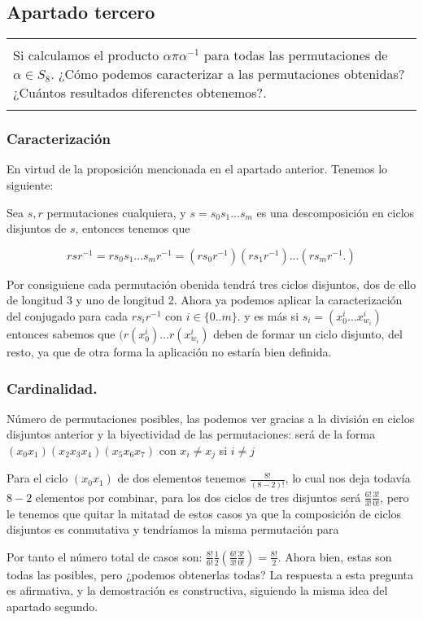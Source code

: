 \documentclass[12pt]{article}
\newenvironment{micaja}
{
    \begin{center}
    \begin{tabular}{|p{0.9\textwidth}|}
    \hline\\
    }   
    {   
    \\\\\hline
    \end{tabular} 
    \end{center}
    }
\begin{document}
\subsection{Apartado tercero}
\begin{micaja}
Si calculamos el producto $\alpha \pi \alpha^{-1}$ para todas las permutaciones de $\alpha \in S_8.$ ¿Cómo podemos caracterizar a las permutaciones obtenidas? ¿Cuántos resultados diferenctes obtenemos?.
\end{micaja}

\subsubsection*{Caracterización}
En virtud de la proposición mencionada en el apartado anterior.
Tenemos lo siguiente:

Sea $s,r$  permutaciones cualquiera, y $s = s_0 s_1 ...  s_m$ es una descomposición en ciclos disjuntos de $s$, entonces tenemos que

$$r s r^{-1} =r s_0 s_1 ...  s_m r^{-1} = (r s_0 r^{-1}) (r s_1 r^{-1}) ... (r s_m r^{-1}.) $$

Por consiguiene cada permutación obenida tendrá tres ciclos disjuntos, dos de ello de longitud 3 y uno de longitud 2. 
Ahora ya podemos aplicar la caracterización del conjugado para cada $r s_i r^{-1}$ con $i \in \{0..m\}.$ y es más si
 $s_i = (x_0^i... x_{w_i}^i)$ entonces sabemos que $(r(x_0^i)... r(x_{w_i}^i)$ deben de formar un ciclo disjunto, del resto, 
ya que de otra forma la aplicación no estaría bien definida. 
\subsubsection*{Cardinalidad.}
Número de permutaciones posibles, las podemos ver gracias a la división en ciclos disjuntos anterior y la biyectividad de las permutaciones: 
será de la forma $(x_0 x_1)( x_2 x_3 x_4)(x_5 x_6 x_7)$ con $x_i \neq x_j$ si $i \neq j$ 

Para el ciclo $(x_0 x_1)$ de dos elementos tenemos $\frac{8!}{(8-2)!}$, lo cual nos deja todavía $8-2$ elementos 
por combinar, para los dos ciclos de tres disjuntos será $\frac{6!}{3!}\frac{3!}{0!}$, pero le tenemos que quitar la mitatad de estos casos
ya que la composición de ciclos disjuntos es conmutativa y tendríamos la misma permutación para 

Por tanto el número total de casos son: $\frac{8!}{6!}\frac{1}{2}(\frac{6!}{3!}\frac{3!}{0!}) = \frac{8!}{2}.$
Ahora bien, estas son todas las posibles, pero ¿podemos obtenerlas todas?
La respuesta a esta pregunta es afirmativa, y la demostración es constructiva, siguiendo 
la misma idea del apartado segundo. 
\end{document}
